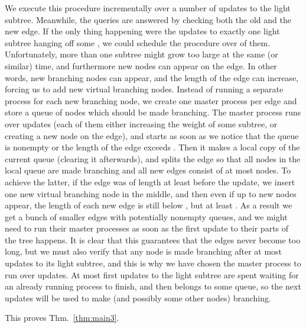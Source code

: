 \documentclass[11pt,onecolumn,final]{article} \usepackage{a4}
\theoremstyle{plain}
\theoremstyle{remark}
\begin{document}
We execute this procedure incrementally over a number of updates to the light subtree. Meanwhile, the queries are answered by checking both the old and the new edge. If the only thing happening were the updates to exactly one light subtree hanging off some , we could schedule the procedure over  of them. Unfortunately, more than one subtree might grow too large at the same (or similar) time, and furthermore new nodes can appear on the edge. In other words, new branching nodes can appear, and the length of the edge can increase, forcing us to add new virtual branching nodes. Instead of running a separate process for each new branching node, we create one master process per edge and store a queue of nodes which should be made branching. The master process runs over  updates (each of them either increasing the weight of some subtree, or creating a new node on the edge), and starts as soon as we notice that the queue is nonempty or the length of the edge exceeds . Then it makes a local copy of the current queue (clearing it afterwards), and splits the edge so that all nodes in the local queue are made branching and all new edges consist of at most  nodes. To achieve the latter, if the edge was of length at least  before the update, we insert one new virtual branching node in the middle, and then even if up to  new nodes appear, the length of each new edge is still below , but at least . As a result we get a bunch of smaller edges with potentially nonempty queues, and we might need to run their master processes as soon as the first update to their parts of the tree happens. It is clear that this guarantees that the edges never become too long, but we must also verify that any node  is made branching after at most  updates to its light subtree, and this is why we have chosen the master process to run over  updates. At most  first updates to the light subtree are spent waiting for an already running process to finish, and then  belongs to some queue, so the next  updates will be used to make  (and possibly some other nodes) branching.

This proves Thm.~\ref{thm:main3}.





\end{document}
